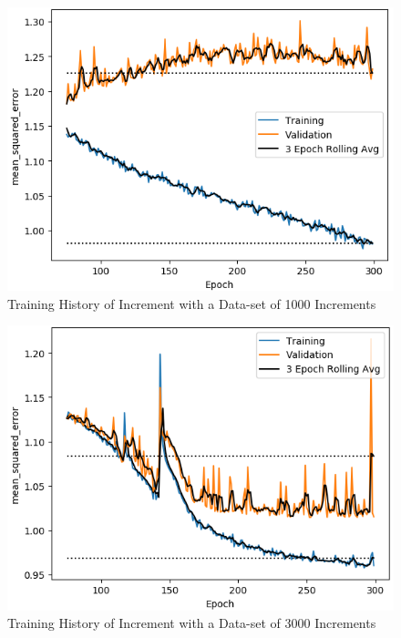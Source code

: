 \begin{figure}[b]
	\centering
	\includegraphics[scale=0.75]{Figures/TrainHistory_dataset_cases1000_C0_321_L0_13_0_321_0_13_48_1_allI0.png}
	\caption{Training History of Increment with a Data-set of 1000 Increments}
	\label{fig:history_1000}
\end{figure}

\begin{figure}[b]
	\centering
	\includegraphics[scale=0.75]{Figures/TrainHistory_dataset_cases3000_C0_321_L0_13_0_321_0_13_48_1_allI0.png}
	\caption{Training History of Increment with a Data-set of 3000 Increments}
	\label{fig:history_3000}
\end{figure}

